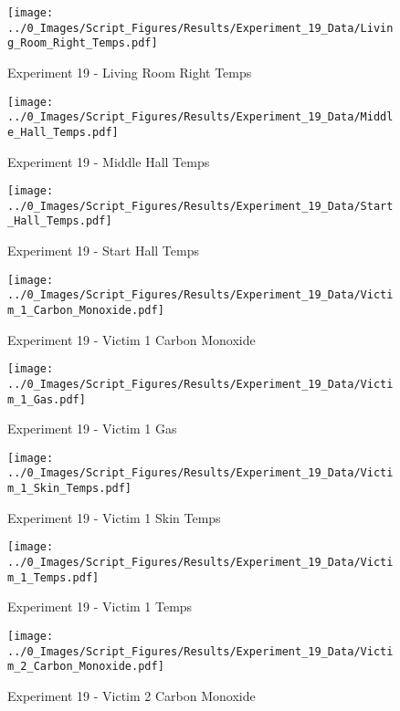 	\clearpage

	\begin{figure}[H]
		\centering
		\texttt{[image: ../0\_Images/Script\_Figures/Results/Experiment\_19\_Data/Living\_Room\_Right\_Temps.pdf]}
		\caption[]{Experiment 19 - Living Room Right Temps}
	\end{figure}
 

	\begin{figure}[H]
		\centering
		\texttt{[image: ../0\_Images/Script\_Figures/Results/Experiment\_19\_Data/Middle\_Hall\_Temps.pdf]}
		\caption[]{Experiment 19 - Middle Hall Temps}
	\end{figure}
 
	\clearpage

	\begin{figure}[H]
		\centering
		\texttt{[image: ../0\_Images/Script\_Figures/Results/Experiment\_19\_Data/Start\_Hall\_Temps.pdf]}
		\caption[]{Experiment 19 - Start Hall Temps}
	\end{figure}
 

	\begin{figure}[H]
		\centering
		\texttt{[image: ../0\_Images/Script\_Figures/Results/Experiment\_19\_Data/Victim\_1\_Carbon\_Monoxide.pdf]}
		\caption[]{Experiment 19 - Victim 1 Carbon Monoxide}
	\end{figure}
 
	\clearpage

	\begin{figure}[H]
		\centering
		\texttt{[image: ../0\_Images/Script\_Figures/Results/Experiment\_19\_Data/Victim\_1\_Gas.pdf]}
		\caption[]{Experiment 19 - Victim 1 Gas}
	\end{figure}
 

	\begin{figure}[H]
		\centering
		\texttt{[image: ../0\_Images/Script\_Figures/Results/Experiment\_19\_Data/Victim\_1\_Skin\_Temps.pdf]}
		\caption[]{Experiment 19 - Victim 1 Skin Temps}
	\end{figure}
 
	\clearpage

	\begin{figure}[H]
		\centering
		\texttt{[image: ../0\_Images/Script\_Figures/Results/Experiment\_19\_Data/Victim\_1\_Temps.pdf]}
		\caption[]{Experiment 19 - Victim 1 Temps}
	\end{figure}
 

	\begin{figure}[H]
		\centering
		\texttt{[image: ../0\_Images/Script\_Figures/Results/Experiment\_19\_Data/Victim\_2\_Carbon\_Monoxide.pdf]}
		\caption[]{Experiment 19 - Victim 2 Carbon Monoxide}
	\end{figure}
 
